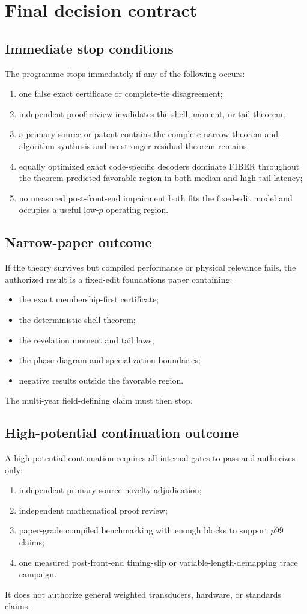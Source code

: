 \documentclass[11pt]{article}
\theoremstyle{definition}
\theoremstyle{remark}
\begin{document}
\section{Final decision contract}
\subsection{Immediate stop conditions}
The programme stops immediately if any of the following occurs:
\begin{enumerate}[leftmargin=2em]
\item one false exact certificate or complete-tie disagreement;
\item independent proof review invalidates the shell, moment, or tail theorem;
\item a primary source or patent contains the complete narrow theorem-and-algorithm synthesis and no stronger residual theorem remains;
\item equally optimized exact code-specific decoders dominate FIBER throughout the theorem-predicted favorable region in both median and high-tail latency;
\item no measured post-front-end impairment both fits the fixed-edit model and occupies a useful low-$p$ operating region.
\end{enumerate}

\subsection{Narrow-paper outcome}
If the theory survives but compiled performance or physical relevance fails, the authorized result is a fixed-edit foundations paper containing:
\begin{itemize}[leftmargin=2em]
\item the exact membership-first certificate;
\item the deterministic shell theorem;
\item the revelation moment and tail laws;
\item the phase diagram and specialization boundaries;
\item negative results outside the favorable region.
\end{itemize}
The multi-year field-defining claim must then stop.

\subsection{High-potential continuation outcome}
A high-potential continuation requires all internal gates to pass and authorizes only:
\begin{enumerate}[leftmargin=2em]
\item independent primary-source novelty adjudication;
\item independent mathematical proof review;
\item paper-grade compiled benchmarking with enough blocks to support $p99$ claims;
\item one measured post-front-end timing-slip or variable-length-demapping trace campaign.
\end{enumerate}
It does not authorize general weighted transducers, hardware, or standards claims.
\end{document}
